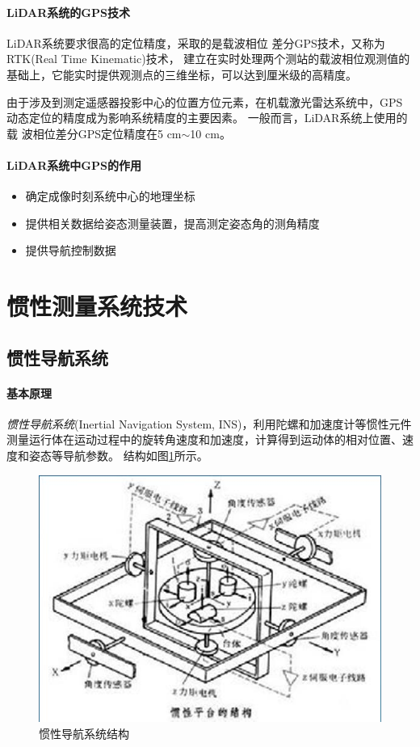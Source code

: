 \paragraph{LiDAR系统的GPS技术}
LiDAR系统要求很高的定位精度，采取的是载波相位 差分GPS技术，又称为RTK(Real Time Kinematic)技术，
建立在实时处理两个测站的载波相位观测值的基础上，它能实时提供观测点的三维坐标，可以达到厘米级的高精度。

由于涉及到测定遥感器投影中心的位置方位元素，在机载激光雷达系统中，GPS动态定位的精度成为影响系统精度的主要因素。
一般而言，LiDAR系统上使用的载 波相位差分GPS定位精度在5 cm$ \sim $10 cm。

\paragraph{LiDAR系统中GPS的作用}
\begin{itemize}
	\item 确定成像时刻系统中心的地理坐标
	\item 提供相关数据给姿态测量装置，提高测定姿态角的测角精度
	\item 提供导航控制数据
\end{itemize}

\section{惯性测量系统技术} %
\subsection{惯性导航系统} %
\paragraph{基本原理}
\textit{惯性导航系统}(Inertial Navigation System, INS)，利用陀螺和加速度计等惯性元件测量运行体在运动过程中的旋转角速度和加速度，计算得到运动体的相对位置、速度和姿态等导航参数。
结构如图\ref{fig:惯性导航系统结构}所示。

\begin{figure}[htbp]
	\centering
	\includegraphics{figure/Chapter3/惯性导航系统结构}
	\caption{惯性导航系统结构}
	\label{fig:惯性导航系统结构}
\end{figure}

